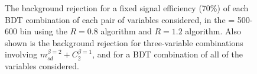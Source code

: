 \begin{figure}
\centering
{}
\caption{The background rejection
for a fixed signal efficiency (70\%) of each BDT combination of
each pair of variables considered, in the \pt = 500-600 \GeV bin using the \antikt $R=0.8$
algorithm and $R=1.2$ algorithm. Also shown is the background
rejection for three-variable combinations involving $m_{sd}^{\beta=2} +
C_2^{\beta=1}$, and for a BDT combination of all of the variables considered.}
\label{fig:pt500_comb2D}
\end{figure}

